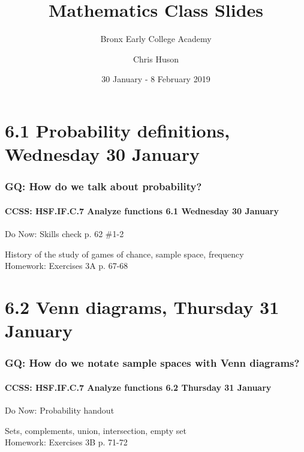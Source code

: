 \documentclass{beamer}
\title{Mathematics Class Slides}
\subtitle{Bronx Early College Academy}
\author{Chris Huson}
\date{30 January - 8 February 2019}
\begin{document}
\frame{\titlepage}

\section[Outline]{}
\frame{\tableofcontents}

\section{6.1 Probability definitions, Wednesday 30 January}
  \frame
  {
    \frametitle{GQ: How do we talk about probability?}
    \framesubtitle{CCSS: HSF.IF.C.7 Analyze functions    \alert{6.1 Wednesday 30 January}}

    \begin{block}{Do Now: Skills check p. 62 \#1-2}
    \end{block}
    History of the study of games of chance, sample space, frequency \\ \bigskip
    Homework: Exercises 3A p. 67-68
  }


\section{6.2 Venn diagrams, Thursday 31 January}
  \frame
  {
    \frametitle{GQ: How do we notate sample spaces with Venn diagrams?}
    \framesubtitle{CCSS: HSF.IF.C.7 Analyze functions    \alert{6.2 Thursday 31 January}}

    \begin{block}{Do Now: Probability handout}
    \end{block}
    Sets, complements, union, intersection, empty set \\ \bigskip
    Homework: Exercises 3B p. 71-72
  }
\end{document}
